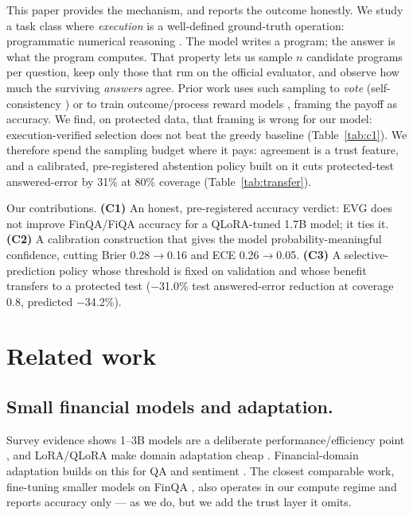 \documentclass[conference]{IEEEtran}
\begin{document}
This paper provides the mechanism, and reports the outcome honestly. We study a task class
where \emph{execution} is a well-defined ground-truth operation: programmatic numerical
reasoning \citep{chen2021finqa}. The model writes a program; the answer is what the
program computes. That property lets us sample $n$ candidate programs per question, keep
only those that run on the official evaluator, and observe how much the surviving \emph{answers}
agree. Prior work uses such sampling to \emph{vote} (self-consistency \citep{wang2023selfconsistency})
or to train outcome/process reward models \citep{lightman2024verify,wang2024mathshepherd},
framing the payoff as accuracy. We find, on protected data, that framing is wrong for our
model: execution-verified selection does not beat the greedy baseline (Table~\ref{tab:c1}).
We therefore spend the sampling budget where it pays: agreement is a trust feature, and a
calibrated, pre-registered abstention policy built on it cuts protected-test answered-error
by 31\% at 80\% coverage (Table~\ref{tab:transfer}).

Our contributions. \textbf{(C1)} An honest, pre-registered accuracy verdict: EVG does not
improve FinQA/FiQA accuracy for a QLoRA-tuned 1.7B model; it ties it. \textbf{(C2)} A
calibration construction that gives the model probability-meaningful confidence, cutting
Brier 0.28$\rightarrow$0.16 and ECE 0.26$\rightarrow$0.05. \textbf{(C3)} A selective-prediction
policy whose threshold is fixed on validation and whose benefit transfers to a protected
test ($-$31.0\% test answered-error reduction at coverage 0.8, predicted $-$34.2\%).

\section{Related work}
\subsection{Small financial models and adaptation.}
Survey evidence shows 1--3B models are a deliberate performance/efficiency point
\citep{subramanian2025slms,abdin2024phi3,zhang2024tinyllama}, and LoRA/QLoRA make domain
adaptation cheap \citep{hu2022lora,dettmers2023qlora}. Financial-domain adaptation builds
on this for QA and sentiment \citep{phogat2024finetuning,yang2023fingpt,yang2023investlm,wu2023bloomberg,huang2020finbert,shi2025kronos}.
The closest comparable work, fine-tuning smaller models on FinQA \citep{phogat2024finetuning},
also operates in our compute regime and reports accuracy only --- as we do, but we add the
trust layer it omits.
\end{document}
